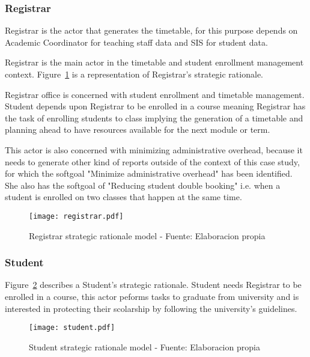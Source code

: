 \subsubsection{Registrar}
Registrar is the actor that generates the timetable, for this purpose depends on Academic Coordinator for teaching staff data and SIS for student data.

Registrar is the main actor in the timetable and student enrollment management context.
Figure~\ref{fig:actorBoundaryRegistrar} is a representation of Registrar's strategic rationale.

Registrar office is concerned with student enrollment and timetable management.
Student depends upon Registrar to be enrolled in a course meaning Registrar has the task of enrolling students to class implying the generation of a timetable and planning ahead to have resources available for the next module or term.

This actor is also concerned with minimizing administrative overhead, because it needs to generate other kind of reports outside of the context of this case study, for which the softgoal "Minimize administrative overhead" has been identified.
She also has the softgoal of "Reducing student double booking" i.e. when a student is enrolled on two classes that happen at the same time.

\begin{landscape}
	\begin{figure}
		\caption{Registrar strategic rationale model - Fuente: Elaboracion propia}
		\texttt{[image: registrar.pdf]}
		\label{fig:actorBoundaryRegistrar}
	\end{figure}
\end{landscape}

\subsubsection{Student}
Figure~\ref{fig:actorBoundaryStudent} describes a Student's strategic rationale.
Student needs Registrar to be enrolled in a course, this actor peforms tasks to graduate from university and is interested in protecting their scolarship by following the university's guidelines.
\begin{landscape}
	\begin{figure}
		\caption{Student strategic rationale model - Fuente: Elaboracion propia}
		\texttt{[image: student.pdf]}
		\label{fig:actorBoundaryStudent}
	\end{figure}
\end{landscape}

